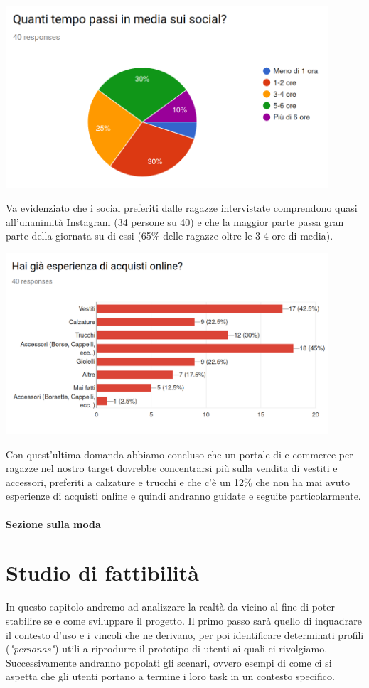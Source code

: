 \documentclass[12pt,a4paper]{report}
\begin{document}
\begin{flushleft}
  \includegraphics[width=0.9\textwidth]{"Images Latex/Grafici Sondaggi/6 - Tempo medio Social"}
\end{flushleft}
Va evidenziato che i social preferiti dalle ragazze intervistate comprendono quasi all'unanimità Instagram (34 persone su 40) e che la maggior parte passa gran parte della giornata su di essi (65\% delle ragazze oltre le 3-4 ore di media).
\begin{flushleft}
  \includegraphics[width=0.9\textwidth]{"Images Latex/Grafici Sondaggi/7 - Esperienza acquisti online"}
\end{flushleft}
Con quest'ultima domanda abbiamo concluso che un portale di e-commerce per ragazze nel nostro target dovrebbe concentrarsi più sulla vendita di vestiti e accessori, preferiti a calzature e trucchi e che c'è un 12\% che non ha mai avuto esperienze di acquisti online e quindi andranno guidate e seguite particolarmente.
\subsubsection{Sezione sulla moda}

\chapter{Studio di fattibilità}
In questo capitolo andremo ad analizzare la realtà da vicino al fine di poter stabilire se e come sviluppare il progetto. Il primo passo sarà quello di inquadrare il contesto d'uso e i vincoli che ne derivano, per poi identificare determinati profili (\textit{"personas"}) utili a riprodurre il prototipo di utenti ai quali ci rivolgiamo. Successivamente andranno popolati gli scenari, ovvero esempi di come ci si aspetta che gli utenti portano a termine i loro task in un contesto specifico.
\end{document}
